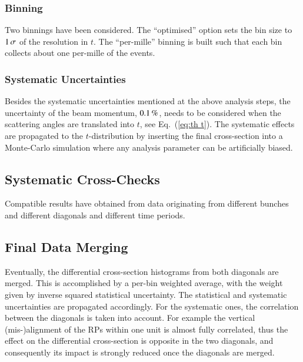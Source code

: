 \subsubsection{Binning}
\label{sec:binning}

Two binnings have been considered. The ``optimised'' option sets the bin size to $1\,{\rm \sigma}$ of the resolution in $t$. The ``per-mille'' binning is built such that each bin collects about one per-mille of the events.



\subsubsection{Systematic Uncertainties}
\label{sec:systematics}

Besides the systematic uncertainties mentioned at the above analysis steps, the uncertainty of the beam momentum, $0.1\,{\rm \%}$, needs to be considered when the scattering angles are translated into $t$, see Eq.~(\ref{eq:th t}). The systematic effects are propagated to the $t$-distribution by inserting the final cross-section into a Monte-Carlo simulation where any analysis parameter can be artificially biased.




\subsection{Systematic Cross-Checks}
\label{sec:cross checks}

Compatible results have obtained from data originating from different bunches and different diagonals and different time periods.


\subsection{Final Data Merging}
\label{sec:final data merging}

Eventually, the differential cross-section histograms from both diagonals are merged. This is accomplished by a per-bin weighted average, with the weight given by inverse squared statistical uncertainty. The statistical and systematic uncertainties are propagated accordingly. For the systematic ones, the correlation between the diagonals is taken into account. For example the vertical (mis-)alignment of the RPs within one unit is almost fully correlated, thus the effect on the differential cross-section is opposite in the two diagonals, and consequently its impact is strongly reduced once the diagonals are merged.

